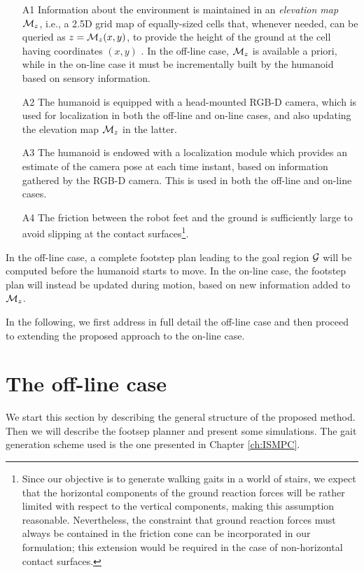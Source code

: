 \begin{itemize}

\item[A1] Information about the environment is maintained in an
{\em elevation map} ${\cal M}_{z}$, i.e., a 2.5D grid map of equally-sized
cells that, whenever needed, can be queried as $z = {\cal M}_{z}(x,y)$, to
provide the height of the ground at the cell having coordinates $(x,y)$
\cite{Burgard2016WorldModeling}.
In the off-line case, ${\cal M}_{z}$ is available a priori, while in the
on-line case it must be incrementally built by the humanoid based on sensory
information. 
    
\item[A2] The humanoid is equipped with a head-mounted RGB-D camera, which is
used for localization in both the off-line and on-line cases, and also updating
the elevation map ${\cal M}_{z}$ in the latter.
    
\item[A3] The humanoid is endowed with a localization module which provides an
estimate of the camera pose at each time instant, based on information gathered
by the RGB-D camera. This is used in both the off-line and on-line cases.

\item[A4] The friction between the robot feet and the ground is sufficiently
large to avoid slipping at the contact surfaces\footnote{Since our objective
is to generate walking gaits in a world of stairs, we expect that the horizontal
components of the ground reaction forces will be rather limited with respect
to the vertical components, making this assumption reasonable. Nevertheless,
the constraint that ground reaction forces must always be contained in the
friction cone can be incorporated in our formulation; this extension would be
required in the case of non-horizontal contact surfaces.}.

\end{itemize}

In the off-line case, a complete footstep plan leading to the goal region
$\cal G$ will be computed before the humanoid starts to move. In the
on-line case, the footstep plan will instead be updated during motion, based on
new information added to ${\cal M}_{z}$. 

In the following, we first address in full detail the off-line case and then
proceed to extending the proposed approach to the on-line case.

\section{The off-line case} 
\label{sec:WoS:offlineCase}
We start this section by describing the general structure of the proposed
method. Then we will describe the footsep planner and present some simulations.
The gait generation scheme used is the one presented in Chapter \ref{ch:ISMPC}.

